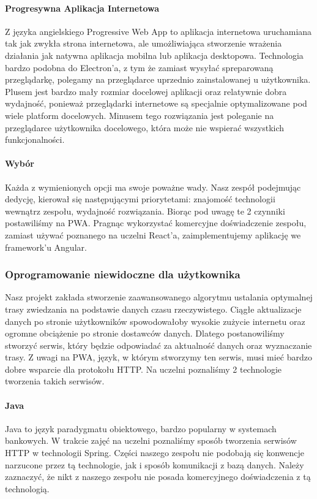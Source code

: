 \paragraph{Progresywna Aplikacja Internetowa}
Z języka angielskiego Progressive Web App to aplikacja internetowa uruchamiana tak jak zwykła strona internetowa, ale umożliwiająca stworzenie wrażenia działania jak natywna aplikacja mobilna lub aplikacja desktopowa.
Technologia bardzo podobna do Electron'a, z tym że zamiast wysyłać spreparowaną przeglądarkę, polegamy na przeglądarce uprzednio zainstalowanej u użytkownika.
Plusem jest bardzo mały rozmiar docelowej aplikacji oraz relatywnie dobra wydajność, ponieważ przeglądarki internetowe są specjalnie optymalizowane pod wiele platform docelowych.
Minusem tego rozwiązania jest poleganie na przeglądarce użytkownika docelowego, która może nie wspierać wszystkich funkcjonalności.

\paragraph{Wybór}
Każda z wymienionych opcji ma swoje poważne wady.
Nasz zespół podejmując dedycję, kierował się następującymi priorytetami: znajomość technologii wewnątrz zespołu, wydajność rozwiązania.
Biorąc pod uwagę te 2 czynniki postawiliśmy na PWA.
Pragnąc wykorzystać komercyjne doświadczenie zespołu, zamiast używać poznanego na uczelni React'a, zaimplementujemy aplikację we framework'u Angular.

\subsubsection{Oprogramowanie niewidoczne dla użytkownika}
Nasz projekt zakłada stworzenie zaawansowanego algorytmu ustalania optymalnej trasy zwiedzania na podstawie danych czasu rzeczywistego.
Ciągłe aktualizacje danych po stronie użytkowników spowodowałoby wysokie zużycie internetu oraz ogromne obciążenie po stronie dostawców danych.
Dlatego postanowiliśmy stworzyć serwis, który będzie odpowiadać za aktualność danych oraz wyznaczanie trasy.
Z uwagi na PWA, język, w którym stworzymy ten serwis, musi mieć bardzo dobre wsparcie dla protokołu HTTP.
Na uczelni poznaliśmy 2 technologie tworzenia takich serwisów.

\paragraph{Java}
Java to język paradygmatu obiektowego, bardzo popularny w systemach bankowych.
W trakcie zajęć na uczelni poznaliśmy sposób tworzenia serwisów HTTP w technologii Spring.
Części naszego zespołu nie podobają się konwencje narzucone przez tą technologie, jak i sposób komunikacji z bazą danych.
Należy zaznaczyć, że nikt z naszego zespołu nie posada komercyjnego doświadczenia z tą technologią.

